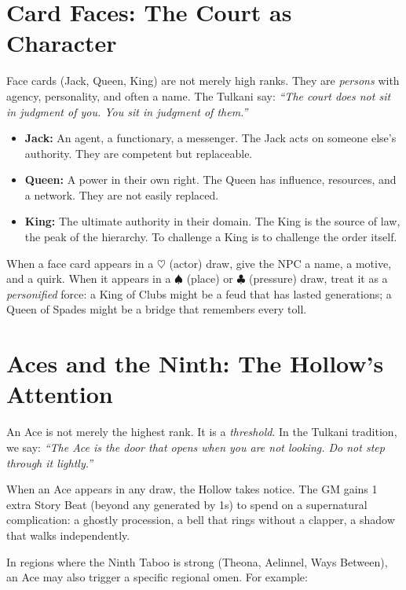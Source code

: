 \documentclass[11pt,letterpaper,twoside]{book}
\begin{document}
\section*{Card Faces: The Court as Character}

Face cards (Jack, Queen, King) are not merely high ranks. They are \textit{persons} with agency, personality, and often a name. The Tulkani say: \textit{``The court does not sit in judgment of you. You sit in judgment of them.''}

\begin{itemize}
    \item \textbf{Jack:} An agent, a functionary, a messenger. The Jack acts on someone else's authority. They are competent but replaceable.
    \item \textbf{Queen:} A power in their own right. The Queen has influence, resources, and a network. They are not easily replaced.
    \item \textbf{King:} The ultimate authority in their domain. The King is the source of law, the peak of the hierarchy. To challenge a King is to challenge the order itself.
\end{itemize}

When a face card appears in a $\heartsuit$ (actor) draw, give the NPC a name, a motive, and a quirk. When it appears in a $\spadesuit$ (place) or $\clubsuit$ (pressure) draw, treat it as a \textit{personified} force: a King of Clubs might be a feud that has lasted generations; a Queen of Spades might be a bridge that remembers every toll.

\section*{Aces and the Ninth: The Hollow's Attention}

An Ace is not merely the highest rank. It is a \textit{threshold}. In the Tulkani tradition, we say: \textit{``The Ace is the door that opens when you are not looking. Do not step through it lightly.''}

When an Ace appears in any draw, the Hollow takes notice. The GM gains 1 extra Story Beat (beyond any generated by 1s) to spend on a supernatural complication: a ghostly procession, a bell that rings without a clapper, a shadow that walks independently.

In regions where the Ninth Taboo is strong (Theona, Aelinnel, Ways Between), an Ace may also trigger a specific regional omen. For example:
\end{document}
